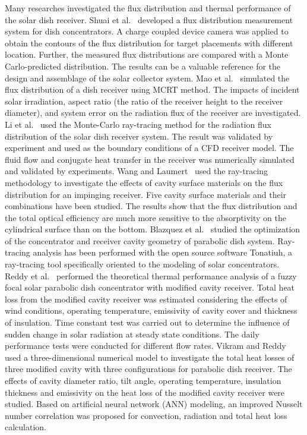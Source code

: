 Many researches investigated the flux distribution and thermal performance of the solar dish receiver.
Shuai et al.~\cite{Shuai2010} developed a flux distribution measurement system for dish concentrators. A charge coupled device camera was applied to obtain the contours of the flux distribution for target placements with different location. Further, the measured flux distributions are compared with a Monte Carlo-predicted distribution. The results can be a valuable reference for the design and assemblage of the solar collector system.
Mao et al.~\cite{Mao2014b} simulated the flux distribution of a dish receiver using MCRT method. The impacts of incident solar irradiation, aspect ratio (the ratio of the receiver height to the receiver diameter), and system error on the radiation flux of the receiver are investigated.
Li et al.~\cite{Li2011b} used the Monte-Carlo ray-tracing method for the radiation flux distribution of the solar dish receiver system. The result was validated by experiment and used as the boundary conditions of a CFD receiver model. The fluid flow and conjugate heat transfer in the receiver was numerically simulated and validated by experiments.
Wang and Laumert~\cite{Wang2017} used the ray-tracing methodology to investigate the effects of cavity surface materials on the flux distribution for an impinging receiver. Five cavity surface materials and their combinations have been studied. The results show that the flux distribution and the total optical efficiency are much more sensitive to the absorptivity on the cylindrical surface than on the bottom.
Blazquez et al.~\cite{Blazquez2016} studied the optimization of the concentrator and receiver cavity geometry of parabolic dish system. Ray-tracing analysis has been performed with the open source software Tonatiuh, a ray-tracing tool specifically oriented to the modeling of solar concentrators.
Reddy et al.~\cite{Reddy2015,Reddy2015b} performed the theoretical thermal performance analysis of a fuzzy focal solar parabolic dish concentrator with modified cavity receiver. Total heat loss from the modified cavity receiver was estimated considering the effects of wind conditions, operating temperature, emissivity of cavity cover and thickness of insulation. Time constant test was carried out to determine the influence of sudden change in solar radiation at steady state conditions. The daily performance tests were conducted for different flow rates.
Vikram and Reddy~\cite{Vikram2015} used a three-dimensional numerical model to investigate the total heat losses of three modified cavity with three configurations for parabolic dish receiver. The effects of cavity diameter ratio, tilt angle, operating temperature, insulation thickness and emissivity on the heat loss of the modified cavity receiver were studied. Based on artificial neural network (ANN) modeling, an improved Nusselt number correlation was proposed for convection, radiation and total heat loss calculation.


